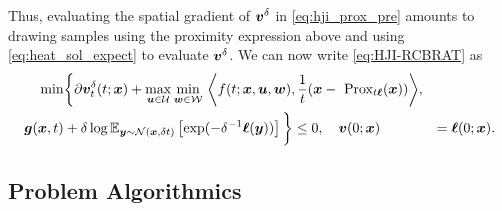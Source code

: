 %
Thus, evaluating the spatial gradient of $\bm{v}^\delta$ in \eqref{eq:hji_prox_pre} amounts to drawing samples using the proximity expression above and using \eqref{eq:heat_sol_expect} to evaluate $\bm{v}^\delta$. We can now write  \eqref{eq:HJI-RCBRAT}  as
%
	\begin{align}
	\min&\bigg\{\partial \valuefunc^\delta_t(t; \state) + \max_{\control \in \mathcal{U}} \min_{\disturb \in \mathcal{W}}\, \bigg\langle f(t; \state, \bm{u}, \bm{w}), \frac{1}{t}(\state - \prox_{t\term}(\state)) \bigg\rangle,  \\ %
	\bm{g}(\state, t) &+ \delta \log \bb{E}_{\bm{y}\sim \mc{N}(\state, \delta t)}\left[\exp(-\delta^{-1} \term(\bm{y}))\right]\bigg\} \le 0, \quad \valuefunc(0; \state) &= \term(0; \state).
	\end{align}

\subsection{Problem Algorithmics} %


